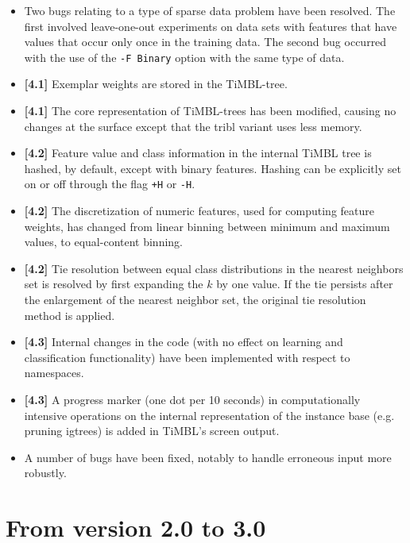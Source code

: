 \documentclass{report}
\begin{document}
\begin{itemize}
\item Two bugs relating to a type of sparse data problem have been
resolved. The first involved leave-one-out experiments on data sets
with features that have values that occur only once in the training
data. The second bug occurred with the use of the {\tt -F Binary}
option with the same type of data.

\item {\bf [4.1]} Exemplar weights are stored in the TiMBL-tree.

\item {\bf [4.1]} The core representation of
TiMBL-trees has been modified, causing no changes at the surface
except that the {\sc tribl} variant uses less memory.

\item {\bf [4.2]} Feature value and class information in the internal
TiMBL tree is hashed, by default, except with binary features. Hashing
can be explicitly set on or off through the flag {\tt +H} or {\tt -H}.

\item {\bf [4.2]} The discretization of numeric
features, used for computing feature weights, has changed from linear
binning between minimum and maximum values, to equal-content binning.

\item {\bf [4.2]} Tie resolution between equal
class distributions in the nearest neighbors set is resolved by first
expanding the $k$ by one value. If the tie persists after the
enlargement of the nearest neighbor set, the original tie resolution
method is applied.

\item {\bf [4.3]} Internal changes in the code (with no effect on
learning and classification functionality) have been implemented with
respect to namespaces.

\item {\bf [4.3]} A progress marker (one dot per 10 seconds) in
computationally intensive operations on the internal representation of
the instance base (e.g. pruning {\sc igtree}s) is added in TiMBL's
screen output.

\item A number of bugs have been fixed, notably to handle erroneous
input more robustly.

\end{itemize}

\section{From version 2.0 to 3.0}
\end{document}
